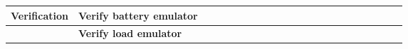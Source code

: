 \begin{table}[ht]
\begin{tabular}{ll|llllllllllllllllllll|}
    \multicolumn{1}{|l|}{\cellcolor[HTML]{38FFF8}\textbf{Verification}}    & \cellcolor[HTML]{38FFF8}\textbf{Verify battery emulator}                                                             & \multicolumn{1}{l|}{}                                   & \multicolumn{1}{l|}{}                                   & \multicolumn{1}{l|}{}                                   & \multicolumn{1}{l|}{}                                   & \multicolumn{1}{l|}{}                                   & \multicolumn{1}{l|}{}                                   & \multicolumn{1}{l|}{}                                   & \multicolumn{1}{l|}{}                                   & \multicolumn{1}{l|}{}                                   & \multicolumn{1}{l|}{}                                    & \multicolumn{1}{l|}{}                                    & \multicolumn{1}{l|}{}                                    & \multicolumn{1}{l|}{}                                    & \multicolumn{1}{l|}{}                                    & \multicolumn{1}{l|}{}                                    & \multicolumn{1}{l|}{\cellcolor[HTML]{F8A102}}            & \multicolumn{1}{l|}{\cellcolor[HTML]{F8A102}}            & \multicolumn{1}{l|}{\cellcolor[HTML]{F8A102}}            & \multicolumn{1}{l|}{}                                    &             \\ \hline
    \multicolumn{1}{|l|}{\cellcolor[HTML]{38FFF8}\textbf{}}                & \cellcolor[HTML]{38FFF8}\textbf{Verify load emulator}                                                                & \multicolumn{1}{l|}{}                                   & \multicolumn{1}{l|}{}                                   & \multicolumn{1}{l|}{}                                   & \multicolumn{1}{l|}{}                                   & \multicolumn{1}{l|}{}                                   & \multicolumn{1}{l|}{}                                   & \multicolumn{1}{l|}{}                                   & \multicolumn{1}{l|}{}                                   & \multicolumn{1}{l|}{}                                   & \multicolumn{1}{l|}{}                                    & \multicolumn{1}{l|}{}                                    & \multicolumn{1}{l|}{}                                    & \multicolumn{1}{l|}{}                                    & \multicolumn{1}{l|}{}                                    & \multicolumn{1}{l|}{}                                    & \multicolumn{1}{l|}{\cellcolor[HTML]{F8A102}}            & \multicolumn{1}{l|}{\cellcolor[HTML]{F8A102}}            & \multicolumn{1}{l|}{\cellcolor[HTML]{F8A102}}            & \multicolumn{1}{l|}{}                                    &             \\ \hline

\end{tabular}
\end{table}
